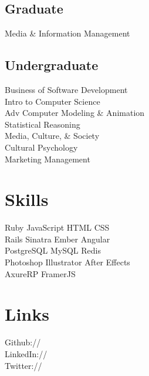 \documentclass[]{deedy-resume-openfont}
\begin{document}
\begin{minipage}[t]{0.33\textwidth}
\subsection{Graduate}
Media \& Information Management \\
\sectionsep

\subsection{Undergraduate}
Business of Software Development \\
Intro to Computer Science \\
Adv Computer Modeling \& Animation \\
Statistical Reasoning \\
Media, Culture, \& Society \\
Cultural Psychology \\
Marketing Management
\sectionsep


\section{Skills}
Ruby \textbullet{}   JavaScript \textbullet{} HTML \textbullet{} CSS \\
Rails \textbullet{} Sinatra \textbullet{} Ember \textbullet{} Angular \\
PostgreSQL \textbullet{} MySQL \textbullet{} Redis \\
Photoshop \textbullet{} Illustrator \textbullet{} After Effects \\
AxureRP \textbullet{} FramerJS \\
\sectionsep


\section{Links} 
Github:// \href{https://github.com/mopineyro}{} \\
LinkedIn://  \href{https://www.linkedin.com/in/manuelopineyro}{} \\
Twitter://  \href{https://twitter.com/mopineyro}{}
\sectionsep

%
%

\end{minipage} 
\end{document}
